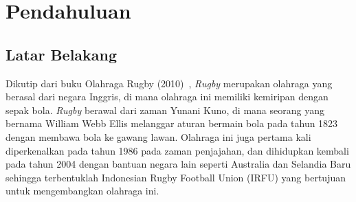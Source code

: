 \chapter{Pendahuluan}
\label{chap:intro}
   
\section{Latar Belakang}
\label{sec:label}


Dikutip dari buku Olahraga Rugby (2010)~\cite{olahraga-rugby}, \textit{Rugby} merupakan olahraga yang berasal dari negara Inggris, di mana olahraga ini memiliki kemiripan dengan sepak bola. \textit{Rugby} berawal dari zaman Yunani Kuno, di mana seorang yang bernama William Webb Ellis melanggar aturan bermain bola pada tahun 1823 dengan membawa bola ke gawang lawan. Olahraga ini juga pertama kali diperkenalkan pada tahun 1986 pada zaman penjajahan, dan dihidupkan kembali pada tahun 2004 dengan bantuan negara lain seperti Australia dan Selandia Baru sehingga terbentuklah Indonesian Rugby Football Union (IRFU) yang bertujuan untuk mengembangkan olahraga ini.


